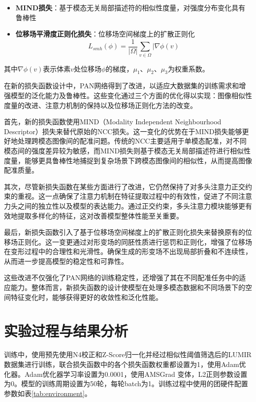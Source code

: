 \begin{itemize}
    \item \textbf{MIND损失}：基于模态无关局部描述符的相似性度量，对强度分布变化具有鲁棒性

    \item \textbf{位移场平滑度正则化损失}：位移场空间梯度上的扩散正则化
          \begin{equation}
              L_{smh}(\phi)=\frac{1}{|\Omega|}\sum_{v\in\Omega}|\nabla \phi(v)
          \end{equation}
          
\end{itemize}

其中$\nabla \phi(v)$表示体素$v$处位移场$\phi$的梯度，$\mu_1$、$\mu_2$、$\mu_3$为权重系数。

在新的损失函数设计中，PAN网络得到了改进，以适应大数据集的训练需求和增强模型的泛化能力及鲁棒性。这些变化通过三个方面的优化得以实现：图像相似性度量的改进、注意力机制的保持以及位移场正则化方法的改变。

首先，新的损失函数使用MIND（Modality Independent Neighbourhood Descriptor）损失来替代原始的NCC损失。这一变化的优势在于MIND损失能够更好地处理跨模态图像间的配准问题。传统的NCC主要适用于单模态配准，对不同模态间的强度差异较为敏感，而MIND损失则基于模态无关局部描述符进行相似性度量，能够更具鲁棒性地捕捉到复杂场景下跨模态图像间的相似性，从而提高图像配准质量。

其次，尽管新损失函数在某些方面进行了改进，它仍然保持了对多头注意力正交约束的重视。这一点确保了注意力机制在特征提取过程中的有效性，促进了不同注意力头之间的独立性以及模型的表达能力。通过正交约束，多头注意力模块能够更有效地提取多样化的特征，这对改善模型整体性能至关重要。

最后，新损失函数引入了基于位移场空间梯度上的扩散正则化损失来替换原有的位移场正则化。这一变更通过对形变场的同胚性质进行惩罚和正则化，增强了位移场在变形过程中的合理性和光滑性。确保生成的形变场不出现局部折叠和不连续性，从而进一步提高模型的稳定性和可靠性。

这些改进不仅强化了PAN网络的训练稳定性，还增强了其在不同配准任务中的适应能力。整体而言，新损失函数的设计使模型在处理多模态数据和不同场景下的空间特征变化时，能够获得更好的收敛性和泛化性能。

\section{实验过程与结果分析}

训练中，使用预先使用N4校正和Z-Score归一化并经过相似性阈值筛选后的LUMIR数据集进行训练，联合损失函数中的各个损失函数权重都设置为1，使用Adam优化器。Adam优化器学习率设置为0.0001，使用AMSGrad 变体，L2正则参数设置为0。模型的训练周期设置为50轮，每轮batch为1。训练过程中使用的团硬件配置参数如表\ref{tab:environment}。

